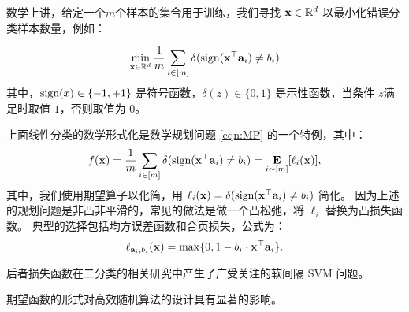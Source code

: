 数学上讲，给定一个$m$个样本的集合用于训练，我们寻找 $\mathbf x \in {\mathbb R}^d$ 以最小化错误分类样本数量，例如：

\begin{equation} \label{eqn:linear-classification}
\min_{\mathbf x \in {\mathbb R}^d}  \frac{1}{m} \sum_{i \in [m]}  \delta( \mathop{\mbox{\rm sign}}(\mathbf x^\top \mathbf{a}_i ) \neq b_i)  
\end{equation}
其中，$\mathop{\mbox{\rm sign}}(x) \in \{-1,+1\}$ 是符号函数，$\delta(z) \in \{0,1\}$ 是示性函数，当条件 $z$满足时取值 $1$，否则取值为 0。

上面线性分类的数学形式化是数学规划问题 \eqref{eqn:MP} 的一个特例，其中：
$$f(\mathbf x) = \frac{1}{m} \sum_{i \in [m]}  \delta( \mathop{\mbox{\rm sign}}(\mathbf x^\top \mathbf{a}_i ) \neq b_i)  = \mathop{\mbox{\bf E}}_{i \sim [m]} [ \ell_i(\mathbf x)]  ,$$
其中，我们使用期望算子以化简，用 $\ell_i(\mathbf x)  = \delta( \mathop{\mbox{\rm sign}}(\mathbf x^\top \mathbf{a}_i ) \neq b_i)$ 简化。
因为上述的规划问题是非凸非平滑的，常见的做法是做一个凸松弛，将 $\ell_i$ 替换为凸损失函数。
典型的选择包括均方误差函数和合页损失，公式为：
$$ \ell_{\mathbf{a}_i, b_i } (\mathbf x) = \max\{ 0, 1 - b_i \cdot \mathbf x^\top \mathbf{a}_i \} . $$

后者损失函数在二分类的相关研究中产生了广受关注的软间隔 SVM 问题。

期望函数的形式对高效随机算法的设计具有显著的影响。

